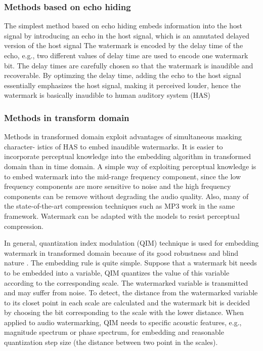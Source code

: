\subsubsection*{Methods based on echo hiding}
The simplest method based on echo hiding embeds information into the host signal by
introducing an echo in the host signal, which is an annutated delayed version of the host
signal \cite{echohiding} The watermark is encoded by the delay time of the echo, e.g., two different
values of delay time are used to encode one watermark bit. The delay times are carefully
chosen so that the watermark is inaudible and recoverable. By optimzing the delay
time, adding the echo to the host signal essentially emphasizes the host signal, making it
perceived louder, hence the watermark is basically inaudible to human auditory system
(HAS)\cite{has}
\subsubsection*{Methods in transform domain}
Methods in transformed domain exploit advantages of simultaneous masking character-
istics of HAS to embed inaudible watermarks. It is easier to incorporate perceptual
knowledge into the embedding algorithm in transformed domain than in time domain. A
simple way of exploiting perceptual knowledge is to embed watermark into the mid-range
frequency component, since the low frequency components are more sensitive to noise
and the high frequency components can be remove without degrading the audio quality.
Also, many of the state-of-the-art compression techniques such as MP3\cite{mp3} work in the same
framework. Watermark can be adapted with the models to resist perceptual compression.

In general, quantization index modulation (QIM)\cite{qim} technique is used for embedding
watermark in transformed domain because of its good robustness and blind nature \cite{QIMtwice}.
The embedding rule is quite simple. Suppose that a watermark bit needs to be embedded
into a variable, QIM quantizes the value of this variable according to the corresponding
scale. The watermarked variable is transmitted and may suffer from noise. To detect, the
distance from the watermarked variable to its closet point in each scale are calculated and
the watermark bit is decided by choosing the bit corresponding to the scale with the lower
distance. When applied to audio watermarking, QIM needs to specific acoustic features,
e.g., magnitude spectrum or phase spectrum, for embedding and reasonable quantization
step size (the distance between two point in the scales).
